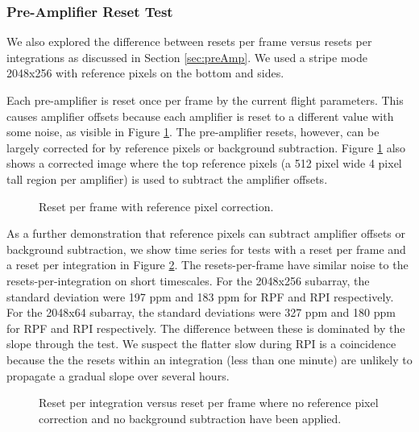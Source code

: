 \documentclass{aastex62}
\begin{document}
{\clearpage
\subsubsection{Pre-Amplifier Reset Test}
We also explored the difference between resets per frame versus resets per integrations as discussed in Section \ref{sec:preAmp}.
We used a stripe mode 2048x256 with reference pixels on the bottom and sides.

Each pre-amplifier is reset once per frame by the current flight parameters.
This causes amplifier offsets because each amplifier is reset to a different value with some noise, as visible in Figure \ref{fig:RPFrefpix}.
The pre-amplifier resets, however, can be largely corrected for by reference pixels or background subtraction.
Figure \ref{fig:RPFrefpix} also shows a corrected image where the top reference pixels (a 512 pixel wide 4 pixel tall region per amplifier) is used to subtract the amplifier offsets.

\begin{figure}
{}
{}
\caption{Reset per frame with reference pixel correction.}\label{fig:RPFrefpix}
\end{figure}

As a further demonstration that reference pixels can subtract amplifier offsets or background subtraction, we show time series for tests with a reset per frame and a reset per integration in Figure \ref{fig:RPFvsRPItseries}.
The resets-per-frame have similar noise to the resets-per-integration on short timescales.
For the 2048x256 subarray, the standard deviation were 197 ppm and 183 ppm for RPF and RPI respectively.
For the 2048x64 subarray, the standard deviations were 327 ppm and 180 ppm for RPF and RPI respectively.
The difference between these is dominated by the slope through the test.
We suspect the flatter slow during RPI is a coincidence because the the resets within an integration (less than one minute) are unlikely to propagate a gradual slope over several hours.


\begin{figure}
{}
{}
\caption{Reset per integration versus reset per frame where no reference pixel correction and no background subtraction have been applied.}\label{fig:RPFvsRPItseries}
\end{figure}

}
\end{document}
